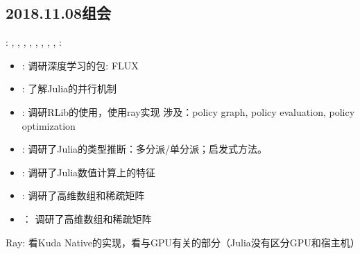 \subsection{2018.11.08组会}
\label{sec:g2018:1019}
: \ZY, \ZhangYX, \ZhangLF, \CaiWT, \DongH, \HeLY, \YuCD, \DaiL, \HeJY
\newline
{}:\CaiWT
\newline

\begin{itemize}
\item \DaiL:
调研深度学习的包: FLUX

\item \ZhangLF:
了解Julia的并行机制

\item \DongH:
调研RLib的使用，使用ray实现
涉及：policy graph, policy evaluation, policy optimization

\item \YuCD:
调研了Julia的类型推断：多分派/单分派；启发式方法。


\item \HeLY:
调研了Julia数值计算上的特征

\item \CaiWT:
调研了高维数组和稀疏矩阵

\item \HeJY：
调研了高维数组和稀疏矩阵

\end{itemize}


Ray: 看Kuda Native的实现，看与GPU有关的部分（Julia没有区分GPU和宿主机）


